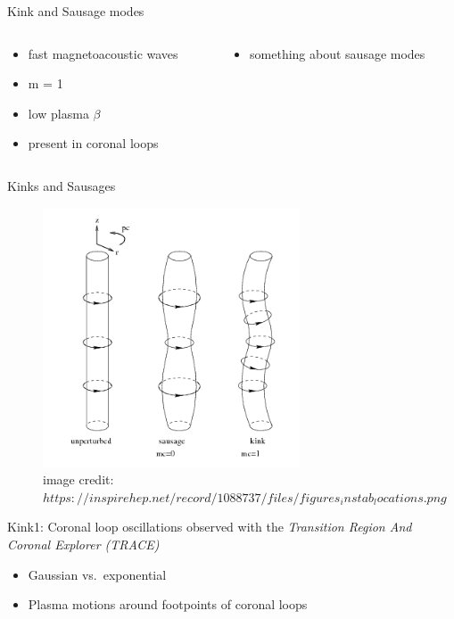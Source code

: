 \documentclass[table]{beamer}
\begin{document}
\begin{frame}{Kink and Sausage modes}

\begin{columns}
    \begin{column}{0.5\textwidth}
    \begin{itemize}
        \item fast magnetoacoustic waves
        \item m = 1
        \item low plasma $\beta$
        \item present in coronal loops
    \end{itemize}
    \end{column}
    \begin{column}{0.5\textwidth}  %
        \begin{itemize}
            \item something about sausage modes
        \end{itemize}
    \end{column}
\end{columns}
\end{frame}

\begin{frame}{Kinks and Sausages}
    \begin{figure}
        \includegraphics[width=3in]{kink_saus.png}
        \caption*{\tiny image credit:
            $https://inspirehep.net/record/1088737/files/figures_instab_locations.png$}
    \end{figure}
\end{frame}


\begin{frame}{Kink1: Coronal loop oscillations observed with the
        \emph{Transition Region And Coronal Explorer (TRACE)}}
    \begin{itemize}
        \item Gaussian vs.\ exponential
        \item Plasma motions around footpoints of coronal loops
    \end{itemize}
\end{frame}
\end{document}
